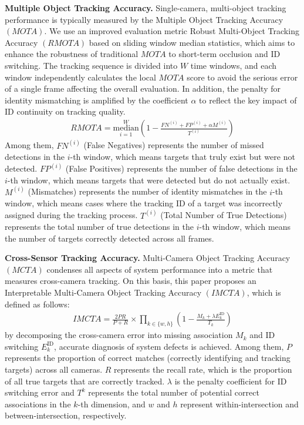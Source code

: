 \documentclass[journal,twoside,web]{ieeecolor}
\begin{document}
\textbf{Multiple Object Tracking Accuracy.}
Single-camera, multi-object tracking performance is typically measured by the Multiple Object Tracking Accuracy \((MOTA)\)\cite{Alpher23b}.
We use an improved evaluation metric Robust Multi-Object Tracking Accuracy \((RMOTA)\) based on sliding window median statistics, which aims to enhance the robustness of traditional \(MOTA\) to short-term occlusion and ID switching.
The tracking sequence is divided into \(W\) time windows, and each window independently calculates the local \(MOTA\) score to avoid the serious error of a single frame affecting the overall evaluation.
In addition, the penalty for identity mismatching is amplified by the coefficient \(\alpha\) to reflect the key impact of ID continuity on tracking quality.
\begin{align}
	RMOTA = \underset{i=1}{\overset{W}{\mathrm{median}}} \left(1 - \frac{FN^{(i)} + FP^{(i)} + \alpha M^{(i)}}{T^{(i)}}\right) 
\end{align}
Among them,
\(FN^{(i)}\) (False Negatives) represents the number of missed detections in the \(i\)-th window, which means targets that truly exist but were not detected.
\(FP^{(i)}\) (False Positives) represents the number of false detections in the \(i\)-th window, which means targets that were detected but do not actually exist.
\(M^{(i)}\) (Mismatches) represents the number of identity mismatches in the \(i\)-th window, which means cases where the tracking ID of a target was incorrectly assigned during the tracking process.
\(T^{(i)}\) (Total Number of True Detections) represents the total number of true detections in the \(i\)-th window, which means the number of targets correctly detected across all frames.

\textbf{Cross-Sensor Tracking Accuracy.}
Multi-Camera Object Tracking Accuracy \((MCTA)\)\cite{Alpher23b} condenses all aspects of system performance into a metric that measures cross-camera tracking.
On this basis, this paper proposes an Interpretable Multi-Camera Object Tracking Accuracy \((IMCTA)\), which is defined as follows:
\begin{align}
	IMCTA = {\frac{2PR}{P + R}}_{\text{}} \times \prod_{k \in \{w, h\}} \left(1 - \frac{M_k + \lambda E_k^{\text{ID}}}{T_k}\right)
\end{align}
by decomposing the cross-camera error into missing association \(M_k\) and ID switching \(E_k^{\text{ID}}\), accurate diagnosis of system defects is achieved.
Among them,
\(P\) represents the proportion of correct matches (correctly identifying and tracking targets) across all cameras.  
\(R\) represents the recall rate, which is the proportion of all true targets that are correctly tracked.  
\(\lambda\) is the penalty coefficient for ID switching error and \(T^{k}\) represents the total number of potential correct associations in the \(k\)-th dimension, and \(w\) and \(h\) represent within-intersection and between-intersection, respectively.
\end{document}
